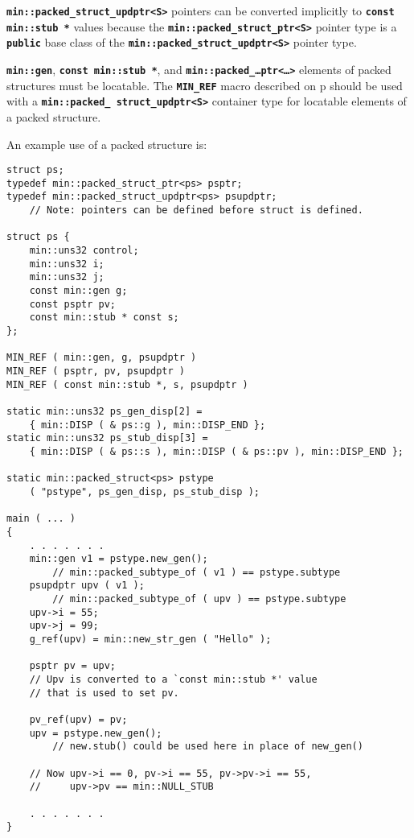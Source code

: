 \documentclass[12pt]{article}
\newcommand{\TT}[1]{{\tt \bfseries #1}}
\newcommand{\pagref}[1]{p\pageref{#1}}
\newcommand{\EOL}{\penalty \exhyphenpenalty}
\newenvironment{indpar}[1][0.3in]%
	{\begin{list}{}%
		     {\setlength{\itemsep}{0in}%
		      \setlength{\topsep}{0in}%
		      \setlength{\parsep}{1ex}%
		      \setlength{\labelwidth}{#1}%
		      \setlength{\leftmargin}{#1}%
		      \addtolength{\leftmargin}{\labelsep}}%
	 \item}%
	{\end{list}}
\begin{document}
\TT{min::\EOL packed\_\EOL struct\_\EOL updptr<S>} pointers can be
converted implicitly to \TT{const min::stub *} values because
the \TT{min::\EOL packed\_\EOL struct\_\EOL ptr<S>} pointer type
is a \TT{public} base class of
the \TT{min::\EOL packed\_\EOL struct\_\EOL updptr<S>} pointer type.

\TT{min::gen}, \TT{const min::stub~*}, and
\TT{min::\EOL packed\_\EOL\ldots ptr<\ldots>}
elements of packed structures must be locatable.
The \TT{MIN\_REF}\label{PACKED_STRUCT_MIN_REF}
macro described on \pagref{MIN_REF}
should be used with a \TT{min::\EOL packed\_\EOL
struct\_\EOL updptr<S>} container type
for locatable elements of a packed structure.

An example use of a packed structure is:
\begin{indpar}\begin{verbatim}
struct ps;
typedef min::packed_struct_ptr<ps> psptr;
typedef min::packed_struct_updptr<ps> psupdptr;
    // Note: pointers can be defined before struct is defined.

struct ps {
    min::uns32 control;
    min::uns32 i;
    min::uns32 j;
    const min::gen g;
    const psptr pv;
    const min::stub * const s;
};

MIN_REF ( min::gen, g, psupdptr )
MIN_REF ( psptr, pv, psupdptr )
MIN_REF ( const min::stub *, s, psupdptr )

static min::uns32 ps_gen_disp[2] =
    { min::DISP ( & ps::g ), min::DISP_END };
static min::uns32 ps_stub_disp[3] =
    { min::DISP ( & ps::s ), min::DISP ( & ps::pv ), min::DISP_END };

static min::packed_struct<ps> pstype
    ( "pstype", ps_gen_disp, ps_stub_disp );

main ( ... )
{
    . . . . . . .
    min::gen v1 = pstype.new_gen();
        // min::packed_subtype_of ( v1 ) == pstype.subtype
    psupdptr upv ( v1 );
        // min::packed_subtype_of ( upv ) == pstype.subtype
    upv->i = 55;
    upv->j = 99;
    g_ref(upv) = min::new_str_gen ( "Hello" );

    psptr pv = upv;
    // Upv is converted to a `const min::stub *' value
    // that is used to set pv.

    pv_ref(upv) = pv;
    upv = pstype.new_gen();
        // new.stub() could be used here in place of new_gen()

    // Now upv->i == 0, pv->i == 55, pv->pv->i == 55,
    //     upv->pv == min::NULL_STUB

    . . . . . . .
}
\end{verbatim}\end{indpar}
\end{document}
